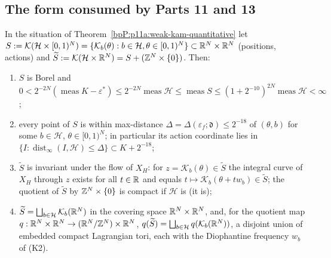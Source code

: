\subsection{The form consumed by Parts 11 and 13}\label{bpP:p11a:sec-q-phys}

\begin{corollary}\label{bpP:p11a:physical-interface}
In the situation of Theorem~\ref{bpP:p11a:weak-kam-quantitative} let $S:=\mathcal K(\mathcal H\times[0,1)^N)=\{\mathcal K_b(\theta):b\in\mathcal H,\theta\in[0,1)^N\}\subset\mathbb{R}^N\times\mathbb{R}^N$ (positions, actions) and $\widetilde S:=\mathcal K(\mathcal H\times\mathbb{R}^N)=S+(\mathbb{Z}^N\times\{0\})$. Then:
\begin{enumerate}[label=(\alph*)]
\item $S$ is Borel and $0<2^{-2N}(\operatorname{meas}K-\varepsilon^*)\le2^{-2N}\operatorname{meas}\mathcal H\le\operatorname{meas}S\le(1+2^{-10})^{2N}\operatorname{meas}\mathcal H<\infty$;
\item every point of $S$ is within max-distance $\Delta=\Delta(\varepsilon_f;\mathfrak d)\le2^{-18}$ of $(\theta,b)$ for some $b\in\mathcal H$, $\theta\in[0,1)^N$; in particular its action coordinate lies in $\{I:\operatorname{dist}_\infty(I,\mathcal H)\le\Delta\}\subset K+2^{-18}$;
\item $\widetilde S$ is invariant under the flow of $X_H$: for $z=\mathcal K_b(\theta)\in\widetilde S$ the integral curve of $X_H$ through $z$ exists for all $t\in\mathbb{R}$ and equals $t\mapsto\mathcal K_b(\theta+tw_b)\in\widetilde S$; the quotient of $\widetilde S$ by $\mathbb{Z}^N\times\{0\}$ is compact if $\mathcal H$ is (it is);
\item $\widetilde S=\bigsqcup_{b\in\mathcal H}\mathcal K_b(\mathbb{R}^N)$ in the covering space $\mathbb{R}^N\times\mathbb{R}^N$, and, for the quotient map $q:\mathbb{R}^N\times\mathbb{R}^N\to(\mathbb{R}^N/\mathbb{Z}^N)\times\mathbb{R}^N$, $q(\widetilde S)=\bigsqcup_{b\in\mathcal H}q(\mathcal K_b(\mathbb{R}^N))$, a disjoint union of embedded compact Lagrangian tori, each with the Diophantine frequency $w_b$ of (K2).
\end{enumerate}
\end{corollary}
